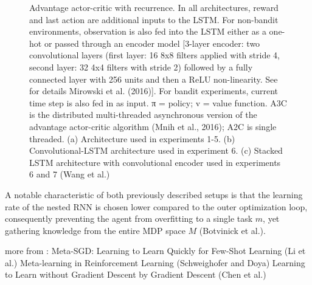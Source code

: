 \documentclass[letterpaper, 10 pt, conference]{ieeeconf}  %
\begin{document}
\begin{figure}[thpb]
        \centering
  \caption{Advantage actor-critic with recurrence. In all architectures, reward and last action are additional inputs
        to the LSTM. For non-bandit environments, observation is also fed into the LSTM either as a one-hot or passed
        through an encoder model [3-layer encoder: two convolutional layers (first layer: 16 8x8 filters applied with
        stride 4, second layer: 32 4x4 filters with stride 2) followed by a fully connected layer with 256 units and then a
        ReLU non-linearity. See for details Mirowski et al. (2016)]. For bandit experiments, current time step is also
        fed in as input. π = policy; v = value function. A3C is the distributed multi-threaded asynchronous version
        of the advantage actor-critic algorithm (Mnih et al., 2016); A2C is single threaded. (a) Architecture used in
        experiments 1-5. (b) Convolutional-LSTM architecture used in experiment 6. (c) Stacked LSTM architecture
        with convolutional encoder used in experiments 6 and 7 (Wang et al.)}
        \label{figurelabel}
     \end{figure}
  

A notable characteristic of both previously described setups is that the learning rate of the nested RNN is chosen lower compared 
to the outer optimization loop, consequently preventing
the agent from overfitting to a single task $m$, yet gathering knowledge from the entire MDP space $M$ (Botvinick et al.).\newline


more from :  \newline
Meta-SGD: Learning to Learn Quickly for Few-Shot Learning (Li et al.) \newline
Meta-learning in Reinforcement Learning (Schweighofer and Doya) \newline
Learning to Learn without Gradient Descent by Gradient Descent (Chen et al.)
\end{document}
